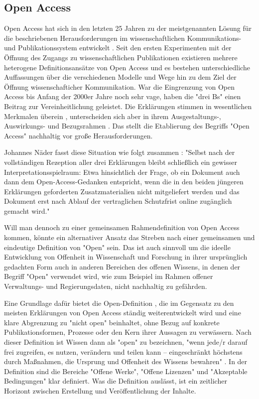 \subsection{Open Access}

Open Access hat sich in den letzten 25 Jahren zu der meistgenannten Lösung für die beschriebenen Herausforderungen im wissenschaftlichen Kommunikations- und Publikationssystem entwickelt \cite{brembs2015open}. Seit den ersten Experimenten mit der Öffnung des Zugangs zu wissenschaftlichen Publikationen existieren mehrere heterogene Definitionsansätze von Open Access und es bestehen unterschiedliche Auffassungen über die verschiedenen Modelle und Wege hin zu dem Ziel der Öffnung wissenschafticher Kommunikation. War die Eingrenzung von Open Access bis Anfang der 2000er Jahre noch sehr vage, haben die "drei Bs" einen Beitrag zur Vereinheitlichung geleistet. Die Erklärungen stimmen in wesentlichen Merkmalen überein \cite{albert_2006_open_implications}, unterscheiden sich aber in ihrem Ausgestaltungs-, Auswirkungs- und Bezugsrahmen \cite{naeder_2010_open}. Das stellt die Etablierung des Begriffs "Open Access" nachhaltig vor große Herausforderungen.

Johannes Näder fasst diese Situation wie folgt zusammen \cite{naeder_2010_open}:
"Selbst nach der vollständigen Rezeption aller drei Erklärungen bleibt schließlich ein gewisser Interpretationsspielraum: Etwa hinsichtlich der Frage, ob ein Dokument auch dann dem Open-Access-Gedanken entspricht, wenn die in den beiden jüngeren Erklärungen geforderten Zusatzmaterialien nicht mitgeliefert werden und das Dokument erst nach Ablauf der vertraglichen Schutzfrist online zugänglich gemacht wird."

Will man dennoch zu einer gemeinsamen Rahmendefinition von Open Access kommen, könnte ein alternativer Ansatz das Streben nach einer gemeinsamen und eindeutige Definition von "Open" sein. Das ist auch sinnvoll um die ideelle Entwicklung von Offenheit in Wissenschaft und Forschung in ihrer ursprünglich gedachten Form auch in anderen Bereichen des offenen Wissens, in denen der Begriff "Open" verwendet wird, wie zum Beispiel im Rahmen offener Verwaltungs- und Regierungsdaten, nicht nachhaltig zu gefährden.

Eine Grundlage dafür bietet die Open-Definition \cite{open_definition}, die im Gegensatz zu den meisten Erklärungen von Open Access ständig weiterentwickelt wird und eine klare Abgrenzung zu "nicht open" beinhaltet, ohne Bezug auf konkrete Publikationsformen, Prozesse oder den Kern ihrer Aussagen zu verwässern. Nach dieser Definition ist Wissen dann als "open" zu bezeichnen, "wenn jede/r darauf frei zugreifen, es nutzen, verändern und teilen kann – eingeschränkt höchstens durch Maßnahmen, die Ursprung und Offenheit des Wissens bewahren" \cite{open_definition}. In der Definition sind die Bereiche "Offene Werke", "Offene Lizenzen" und "Akzeptable Bedingungen" klar definiert. Was die Definition auslässt, ist ein zeitlicher Horizont zwischen Erstellung und Veröffentlichung der Inhalte.

